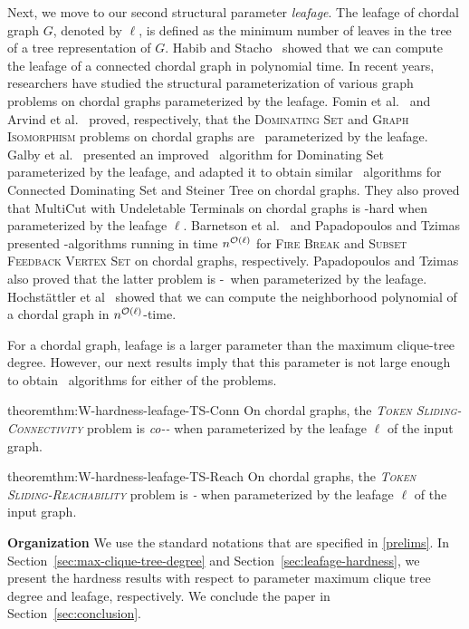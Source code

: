 Next, we move to our second structural parameter \emph{leafage}.
The {leafage} of chordal graph $G$, denoted by $\ell$, is defined as 
the minimum number of leaves in the tree of a tree representation of $G$.
Habib and Stacho~\cite{DBLP:conf/esa/HabibS09} showed that we can 
compute the leafage of a connected chordal graph in polynomial time. 
In recent years, researchers have studied the structural parameterization of various graph problems on chordal graphs parameterized by the leafage.
Fomin et al.~\cite{DBLP:journals/algorithmica/FominGR20} and Arvind et al.~\cite{DBLP:journals/corr/ArvindNPZ22} proved, respectively, that the \textsc{Dominating Set} and \textsc{Graph Isomorphism} problems on chordal graphs are \FPT\ parameterized by the leafage.
Galby et al.~\cite{DBLP:journals/algorithmica/GalbyMSST24} presented 
an improved \FPT\ algorithm for {\sc Dominating Set} parameterized by the 
leafage, and adapted it to obtain 
similar \FPT\ algorithms for {\sc Connected Dominating Set} and 
{\sc Steiner Tree} on chordal graphs.
They also proved that
{\sc MultiCut with Undeletable Terminals} on chordal graphs
is {\W[1]-hard} when parameterized by the leafage $\ell$.
Barnetson et al.~\cite{DBLP:journals/networks/BarnetsonBEHPR21} and Papadopoulos and Tzimas \cite{DBLP:conf/iwoca/PapadopoulosT22} presented \XP-algorithms running in time $n^{{\mathcal O}(\ell)}$ for \textsc{Fire Break} and \textsc{Subset Feedback Vertex Set} 
on chordal graphs, respectively.
Papadopoulos and Tzimas \cite{DBLP:conf/iwoca/PapadopoulosT22} also 
proved that the latter problem is \W[1]-\hard\ when 
parameterized by the leafage.
Hochst{\"{a}}ttler et al~\cite{DBLP:journals/dam/HochstattlerHMP21} showed that we can compute the neighborhood polynomial of a chordal graph in $n^{{\mathcal O}(\ell)}$-time.

For a chordal graph, leafage is a larger parameter than
the maximum clique-tree degree.
However, our next results imply that this parameter is not large enough
to obtain \FPT\ algorithms for either of the problems. 

\begin{restatable}{theorem}{thm:W-hardness-leafage-TS-Conn}
\label{thm:W-hardness-leafage-TS-Conn}
On chordal graphs, the 
\emph{\textsc{Token Sliding-Connectivity}} problem is 
\emph{co-\W[1]-\hard} when parameterized by the leafage $\ell$
of the input graph.
\end{restatable}

\begin{restatable}{theorem}{thm:W-hardness-leafage-TS-Reach}
\label{thm:W-hardness-leafage-TS-Reach}
On chordal graphs, the 
\emph{\textsc{Token Sliding-Reachability}} problem is 
\emph{\W[1]-\hard} when parameterized by the leafage $\ell$
of the input graph.
\end{restatable}

\noindent \textbf{Organization}
We use the standard notations that are specified in 
\cref{prelims}.
In Section~\ref{sec:max-clique-tree-degree} and 
Section~\ref{sec:leafage-hardness}, we present the hardness
results with respect to parameter maximum clique tree degree
and leafage, respectively.
We conclude the paper in Section~\ref{sec:conclusion}.




